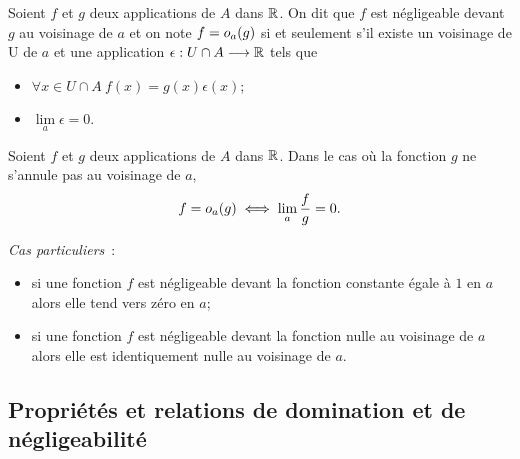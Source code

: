 \begin{defdef}
  Soient \(f\) et \(g\) deux applications de \(A\) dans \(\mathbb{R}\). On dit que \(f\) est négligeable devant \(g\) au voisinage de \(a\) et on note \(f=o\mathopen{}_{a}\left(g\right)\) si et seulement s'il existe un voisinage de U de \(a\) et une application \(\epsilon : U\cap A \longrightarrow \mathbb{R}\) tels que
  \begin{itemize}
  \item \(\forall x \in U \cap A \ f(x)=g(x)\epsilon(x)\);
  \item \(\lim\limits_{a} \epsilon =0\).
  \end{itemize}
\end{defdef}
\begin{prop}
  Soient \(f\) et \(g\) deux applications de \(A\) dans \(\mathbb{R}\). Dans le cas où la fonction \(g\) ne s'annule pas au voisinage de \(a\),
  \begin{equation}
    f=o\mathopen{}_{a}\left(g\right) \iff \lim\limits_{a} \frac{f}{g}=0.
  \end{equation}
\end{prop}

\emph{Cas particuliers}~:
\begin{itemize}
\item si une fonction \(f\) est négligeable devant la fonction constante égale à \(1\) en \(a\) alors elle tend vers zéro en \(a\);
\item si une fonction \(f\) est négligeable devant la fonction nulle au voisinage de \(a\) alors elle est identiquement nulle au voisinage de \(a\).
\end{itemize}

\subsection{Propriétés et relations de domination et de négligeabilité}

